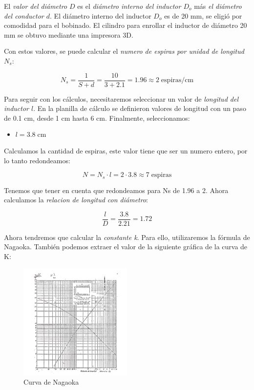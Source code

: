 El \textit{valor del diámetro $D$} es el \textit{diámetro interno del inductor $D_o$} más \textit{el diámetro del conductor $d$}. El diámetro interno del inductor $D_o$ es de 20 mm, se eligió por comodidad para el bobinado.
El cilindro para enrollar el inductor de diámetro 20 mm se obtuvo mediante una impresora 3D.

Con estos valores, se puede calcular el \textit{numero de espiras por unidad de longitud $N_s$}:

\begin{equation}
    N_s = \frac{1}{S + d} = \frac{10}{3 + 2.1 } = 1.96 \approx 2 \; \text{espiras/cm}
\end{equation}

Para seguir con los cálculos, necesitaremos seleccionar un valor de \textit{longitud del inductor $l$}. En la planilla de cálculo se definieron valores de longitud con un paso de 0.1 cm, desde 1 cm hasta 6 cm.
Finalmente, seleccionamos:

\begin{itemize}
    \item $l = 3.8\; \text{cm}$
\end{itemize}

Calculamos la cantidad de espiras, este valor tiene que ser un numero entero, por lo tanto redondeamos:

\begin{equation}
    N = N_s \cdot l = 2 \cdot 3.8 \approx 7\; \text{espiras} 
\end{equation}

Tenemos que tener en cuenta que redondeamos para Ns de 1.96 a 2. Ahora calculamos la \textit{relacion de longitud con diámetro}:

\begin{equation}
    \frac{l}{D} = \frac{3.8}{2.21} = 1.72
\end{equation}

Ahora tendremos que calcular la \textit{constante k}. Para ello, utilizaremos la fórmula de Nagaoka. También podemos extraer el valor de la siguiente gráfica 
de la curva de K:

\begin{figure}[H]
    \centering
    \includegraphics[width=0.5\textwidth]{Imagenes/curva.png}
    \caption{Curva de Nagaoka}
\end{figure}

